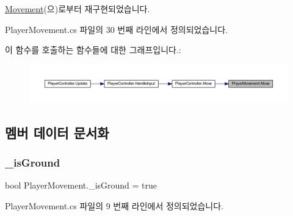 \mbox{\hyperlink{class_movement_ad400f155e0556a5e22a74cb77858460a}{Movement}}(으)로부터 재구현되었습니다.



Player\+Movement.\+cs 파일의 30 번째 라인에서 정의되었습니다.


\begin{DoxyCode}{0}

\end{DoxyCode}
이 함수를 호출하는 함수들에 대한 그래프입니다.\+:
\nopagebreak
\begin{figure}[H]
\begin{center}
\leavevmode
\includegraphics[width=350pt]{d0/d3d/class_player_movement_a339fca7a54775c8016fb137e3f1b1df7_icgraph}
\end{center}
\end{figure}


\subsection{멤버 데이터 문서화}
\mbox{\label{class_player_movement_a3096725f76488ebfdc761c53e9fac852}} 
\subsubsection{\texorpdfstring{\_isGround}{\_isGround}}
{\footnotesize\ttfamily bool Player\+Movement.\+\_\+is\+Ground = true}



Player\+Movement.\+cs 파일의 9 번째 라인에서 정의되었습니다.

\mbox{\label{class_player_movement_a802b794d028125d4e547a9caeb90d3d4}} 
